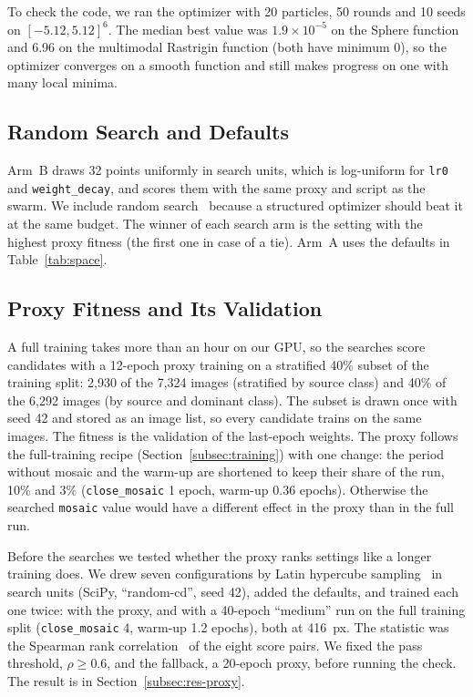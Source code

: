 To check the code, we ran the optimizer with 20 particles, 50 rounds and 10 seeds on $[-5.12, 5.12]^6$. The median best value was $1.9\times10^{-5}$ on the Sphere function and 6.96 on the multimodal Rastrigin function (both have minimum 0), so the optimizer converges on a smooth function and still makes progress on one with many local minima.

\subsection{Random Search and Defaults}
\label{subsec:random}

Arm~B draws 32 points uniformly in search units, which is log-uniform for \texttt{lr0} and \texttt{weight\_decay}, and scores them with the same proxy and script as the swarm. We include random search~\cite{bergstra2012random} because a structured optimizer should beat it at the same budget. The winner of each search arm is the setting with the highest proxy fitness (the first one in case of a tie). Arm~A uses the defaults in Table~\ref{tab:space}.

\subsection{Proxy Fitness and Its Validation}
\label{subsec:proxy}

A full training takes more than an hour on our GPU, so the searches score candidates with a 12-epoch proxy training on a stratified 40\% subset of the training split: 2,930 of the 7,324 \genone images (stratified by source class) and 40\% of the 6,292 \gentwo images (by source and dominant class). The subset is drawn once with seed 42 and stored as an image list, so every candidate trains on the same images. The fitness is the validation \mapfifty of the last-epoch weights. The proxy follows the full-training recipe (Section~\ref{subsec:training}) with one change: the period without mosaic and the warm-up are shortened to keep their share of the run, 10\% and 3\% (\texttt{close\_mosaic} 1 epoch, warm-up 0.36 epochs). Otherwise the searched \texttt{mosaic} value would have a different effect in the proxy than in the full run.

Before the \genone searches we tested whether the proxy ranks settings like a longer training does. We drew seven configurations by Latin hypercube sampling~\cite{mckay1979comparison} in search units (SciPy, ``random-cd'', seed 42), added the defaults, and trained each one twice: with the proxy, and with a 40-epoch ``medium'' run on the full training split (\texttt{close\_mosaic} 4, warm-up 1.2 epochs), both at 416~px. The statistic was the Spearman rank correlation~\cite{spearman1904proof} of the eight score pairs. We fixed the pass threshold, $\rho \ge 0.6$, and the fallback, a 20-epoch proxy, before running the check. The result is in Section~\ref{subsec:res-proxy}.


